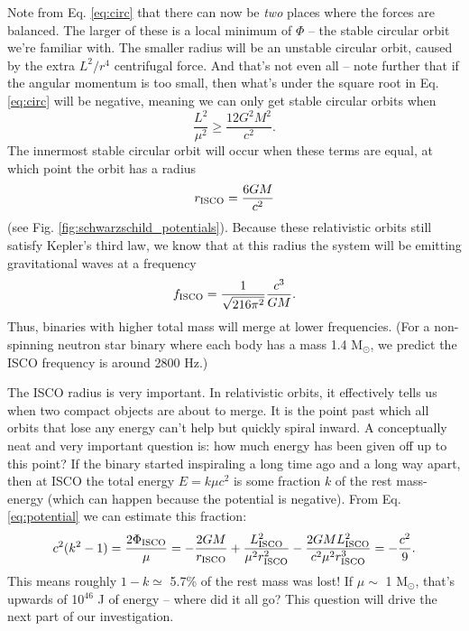 \documentclass[11pt]{article}
\begin{document}
\begin{enumerate}
\hspace{15pt} Note from Eq. \ref{eq:circ} that there can now be \emph{two} places where the forces are balanced. The larger of these is a local minimum of $\Phi$ -- the stable circular orbit we're familiar with. The smaller radius will be an unstable circular orbit, caused by the extra $L^2/r^4$ centrifugal force. And that's not even all -- note further that if the angular momentum is too small, then what's under the square root in Eq. \ref{eq:circ} will be negative, meaning we can only get stable circular orbits when
\begin{equation}
\frac{L^2}{\mu^2} \geq \frac{12G^2M^2}{c^2}.
\end{equation}
The innermost stable circular orbit will occur when these terms are equal, at which point the orbit has a radius
\begin{equation}
r_{\rm ISCO} = \frac{6GM}{c^2}
\end{equation}
(see Fig. \ref{fig:schwarzschild_potentials}). Because these relativistic orbits still satisfy Kepler's third law, we know that at this radius the system will be emitting gravitational waves at a frequency
\[ f_{\rm ISCO} = \frac{1}{\sqrt{216\pi^2}} \frac{c^3}{GM}. \]
Thus, binaries with higher total mass will merge at lower frequencies. (For a non-spinning neutron star binary where each body has a mass 1.4 M$_{\odot}$, we predict the ISCO frequency is around 2800 Hz.)

\hspace{15pt} The ISCO radius is very important. In relativistic orbits, it effectively tells us when two compact objects are about to merge. It is the point past which all orbits that lose any energy can't help but quickly spiral inward. A conceptually neat and very important question is: how much energy has been given off up to this point? If the binary started inspiraling a long time ago and a long way apart, then at ISCO the total energy $E=k\mu c^2$ is some fraction $k$ of the rest mass-energy (which can happen because the potential is negative). From Eq. \ref{eq:potential} we can estimate this fraction:
\[ c^2(k^2 - 1) = \frac{2\Phi_{\rm ISCO}}{\mu} = -\frac{2GM}{r_{\rm ISCO}} + \frac{L_{\rm ISCO}^2}{\mu^2 r_{\rm ISCO}^2} - \frac{2GML_{\rm ISCO}^2}{c^2\mu^2r_{\rm ISCO}^3} = -\frac{c^2}{9}. \]
This means roughly $1-k \simeq$ 5.7\% of the rest mass was lost! If $\mu \sim$ 1 M$_{\odot}$, that's upwards of 10$^{46}$ J of energy --  where did it all go? This question will drive the next part of our investigation.


\end{enumerate}
\end{document}
